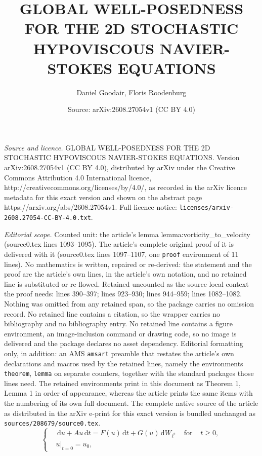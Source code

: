 \documentclass[10pt,a4paper]{amsart}
\title{GLOBAL WELL-POSEDNESS FOR THE 2D STOCHASTIC HYPOVISCOUS NAVIER-STOKES EQUATIONS}
\author{Daniel Goodair, Floris Roodenburg}
\date{Source: arXiv:2608.27054v1 (CC BY 4.0)}
\newcommand{\dd}{\hspace{2pt}\mathrm{d}}
\begin{document}
\maketitle

\noindent\emph{Source and licence.} GLOBAL WELL-POSEDNESS FOR THE 2D STOCHASTIC HYPOVISCOUS NAVIER-STOKES EQUATIONS. Version arXiv:2608.27054v1 (CC BY 4.0), distributed by arXiv under the Creative Commons Attribution 4.0 International licence, http://creativecommons.org/licenses/by/4.0/, as recorded in the arXiv licence metadata for this exact version and shown on the abstract page https://arxiv.org/abs/2608.27054v1. Full licence notice: \texttt{licenses/arxiv-2608.27054-CC-BY-4.0.txt}.\par\smallskip

\noindent\textit{Editorial scope.} Counted unit: the article's lemma lemma:vorticity\_to\_velocity (source0.tex lines 1093--1095). The article's complete original proof of it is delivered with it (source0.tex lines 1097--1107, one \texttt{proof} environment of 11 lines). No mathematics is written, repaired or re-derived: the statement and the proof are the article's own lines, in the article's own notation, and no retained line is substituted or re-flowed.  Retained uncounted as the source-local context the proof needs: lines 390--397; lines 923--930; lines 944--959; lines 1082--1082.  Nothing was omitted from any retained span, so the package carries no omission record.  No retained line contains a citation, so the wrapper carries no bibliography and no bibliography entry.  No retained line contains a figure environment, an image-inclusion command or drawing code, so no image is delivered and the package declares no asset dependency.  Editorial formatting only, in addition: an AMS \texttt{amsart} preamble that restates the article's own declarations and macros used by the retained lines, namely the environments \texttt{theorem}, \texttt{lemma} on separate counters, together with the standard packages those lines need.  The retained environments print in this document as Theorem 1, Lemma 1 in order of appearance, whereas the article prints the same items with the numbering of its own full document.  The complete native source of the article as distributed in the arXiv e-print for this exact version is bundled unchanged as \texttt{sources/208679/source0.tex}.
\begin{equation}\label{eq:abstract_eq}
       \left\{
        \begin{aligned}
            &\dd u + A u \dd t = F(u)\dd t + G(u)\dd W_{\ell^2}&\text{ for }&t\geq 0,\\
            &u|_{t=0}=u_0,
        \end{aligned}
        \right.
\end{equation}
\end{document}
